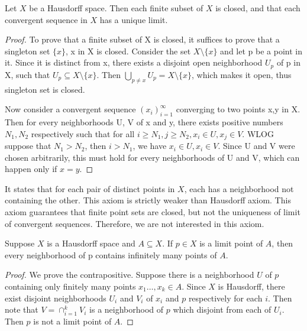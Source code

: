 \documentclass[11pt,a4paper]{article}
\begin{document}
\begin{prop}
    Let $X$ be a Hausdorff space. Then each finite subset of $X$ is closed, and that each convergent sequence in $X$ has a unique limit.
\end{prop}

\begin{proof}
    To prove that a finite subset of X is closed, it suffices to prove that a singleton set $\{x\}$, x in X is closed. Consider the set $X\setminus\{x\}$ and let p be a point in it. Since it is distinct from x, there exists a disjoint open neighborhood $U_p$ of p in X, such that $U_p\subseteq X\setminus\{x\}$. Then $\underset{p\neq x}{\bigcup}U_p = X\setminus\{x\}$, which makes it open, thus singleton set is closed. 

    Now consider a convergent sequence $(x_i)_{i=1}^\infty$ converging to two points x,y in X. Then for every neighborhoods U, V of x and y, there exists positive numbers $N_1, N_2$ respectively such that for all $i\ge N_1, j\ge N_2, x_i\in U, x_j\in V$. WLOG suppose that $N_1>N_2$, then $i>N_1$, we have $x_i\in U, x_i\in V$. Since U and V were chosen arbitrarily, this must hold for every neighborhoods of U and V, which can happen only if $x=y$. 
\end{proof}

\begin{remark}[$T_1$-axiom]
It states that for each pair of distinct points in $X$, each has a neighborhood not containing the other. This axiom is strictly weaker than Hausdorff axiom. This axiom guarantees that finite point sets are closed, but not the uniqueness of limit of convergent sequences. Therefore, we are not interested in this axiom.
\end{remark}

\begin{prop}\label{prop:limit_point_infinite_intersection}
Suppose $X$ is a Hausdorff space and $A\subseteq X$. If $p\in X$ is a limit point of $A$, then every neighborhood of p contains infinitely many points of $A$.
\end{prop}

\begin{proof}
We prove the contrapositive. Suppose there is a neighborhood $U$ of $p$ containing only finitely many points $x_1\ldots,x_k\in A$. Since $X$ is Hausdorff, there exist disjoint neighborhoods $U_i$ and $V_i$ of $x_i$ and $p$ respectively for each $i$. Then note that $V = \cap_{i=1}^k V_i$ is a neighborhood of $p$ which disjoint from each of $U_i$. Then $p$ is not a limit point of $A$.
\end{proof}
\end{document}
